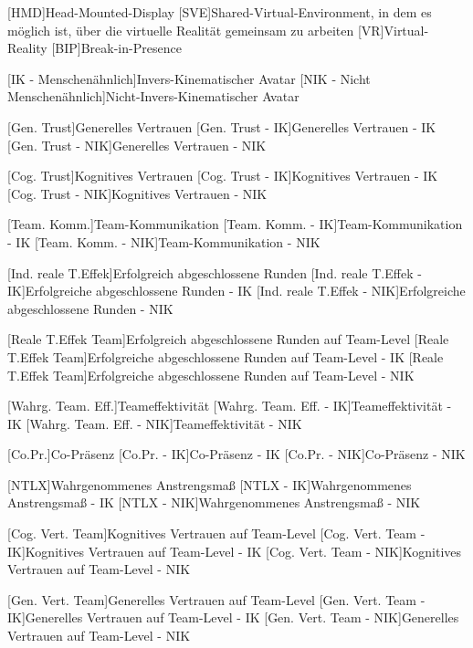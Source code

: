 \begin{acronym}
	[HMD]{Head-Mounted-Display}
	[SVE]{Shared-Virtual-Environment, in dem es möglich ist, über die virtuelle Realität gemeinsam zu arbeiten}
	[VR]{Virtual-Reality}
	[BIP]{Break-in-Presence}
	
	[IK - Menschenähnlich]{Invers-Kinematischer Avatar}
	[NIK - Nicht Menschenähnlich]{Nicht-Invers-Kinematischer Avatar}
	
	[Gen. Trust]{Generelles Vertrauen}
	[Gen. Trust - IK]{Generelles Vertrauen - IK}
	[Gen. Trust - NIK]{Generelles Vertrauen - NIK}
	
	[Cog. Trust]{Kognitives Vertrauen}
	[Cog. Trust - IK]{Kognitives Vertrauen - IK}
	[Cog. Trust - NIK]{Kognitives Vertrauen - NIK}
	
	[Team. Komm.]{Team-Kommunikation}
	[Team. Komm. - IK]{Team-Kommunikation - IK}
	[Team. Komm. - NIK]{Team-Kommunikation - NIK}
	
	[Ind. reale T.Effek]{Erfolgreich abgeschlossene Runden}
	[Ind. reale T.Effek - IK]{Erfolgreiche abgeschlossene Runden - IK}
	[Ind. reale T.Effek - NIK]{Erfolgreiche abgeschlossene Runden - NIK}	
	
	[Reale T.Effek Team]{Erfolgreich abgeschlossene Runden auf Team-Level}
	[Reale T.Effek Team]{Erfolgreiche abgeschlossene Runden auf Team-Level - IK}
	[Reale T.Effek Team]{Erfolgreiche abgeschlossene Runden auf Team-Level - NIK}
	
	[Wahrg. Team. Eff.]{Teameffektivität}
	[Wahrg. Team. Eff. - IK]{Teameffektivität - IK}
	[Wahrg. Team. Eff. - NIK]{Teameffektivität - NIK}
	
	[Co.Pr.]{Co-Präsenz}
	[Co.Pr. - IK]{Co-Präsenz - IK}
	[Co.Pr. - NIK]{Co-Präsenz - NIK}
	
	[NTLX]{Wahrgenommenes Anstrengsmaß}
	[NTLX - IK]{Wahrgenommenes Anstrengsmaß - IK}
	[NTLX - NIK]{Wahrgenommenes Anstrengsmaß - NIK}
	
	[Cog. Vert. Team]{Kognitives Vertrauen auf Team-Level}
	[Cog. Vert. Team - IK]{Kognitives Vertrauen auf Team-Level - IK}
	[Cog. Vert. Team - NIK]{Kognitives Vertrauen auf Team-Level - NIK}
	
	[Gen. Vert. Team]{Generelles Vertrauen auf Team-Level}
	[Gen. Vert. Team - IK]{Generelles Vertrauen auf Team-Level - IK}
	[Gen. Vert. Team - NIK]{Generelles Vertrauen auf Team-Level - NIK}
	

\end{acronym}
